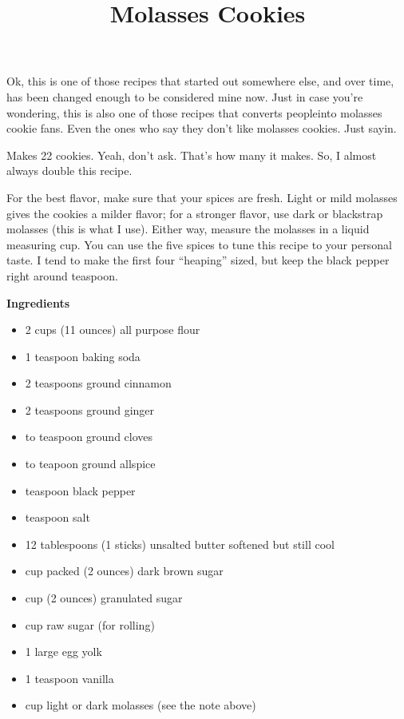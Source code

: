 \documentclass{article}
\title{Molasses Cookies}
\begin{document}
Ok, this is one of those recipes that started out somewhere else, and
over time, has been changed enough to be considered mine now. Just in
case you're wondering, this is also one of those recipes that converts
peopleinto molasses cookie fans. Even the ones who say they don't like
molasses cookies. Just sayin.

Makes 22 cookies. Yeah, don't ask. That's how many it makes. So, I almost
always double this recipe.

For the best flavor, make sure that your spices are fresh. Light or mild
molasses gives the cookies a milder flavor; for a stronger flavor, use
dark or blackstrap molasses (this is what I use). Either way, measure
the molasses in a liquid measuring cup. You can use the five spices to
tune this recipe to your personal taste. I tend to make the first four
``heaping'' sized, but keep the black pepper right around  teaspoon.

\begin{multicols}{2}

      \textbf{Ingredients}

      \begin{itemize}
            \item 2 cups (11 ounces) all purpose flour
            \item 1 teaspoon baking soda
            \item 2 teaspoons ground cinnamon
            \item 2 teaspoons ground ginger
            \item {} to  teaspoon ground cloves
            \item {} to  teapoon ground allspice
            \item {} teaspoon black pepper
            \item {} teaspoon salt

                  \columnbreak

            \item 12 tablespoons (1 sticks) unsalted butter softened but still cool
            \item {} cup packed (2 ounces) dark brown sugar
            \item {} cup (2 ounces) granulated sugar
            \item {} cup raw sugar (for rolling)
            \item 1 large egg yolk
            \item 1 teaspoon vanilla
            \item {} cup light or dark molasses (see the note above)
      \end{itemize}

\end{multicols}
\end{document}
